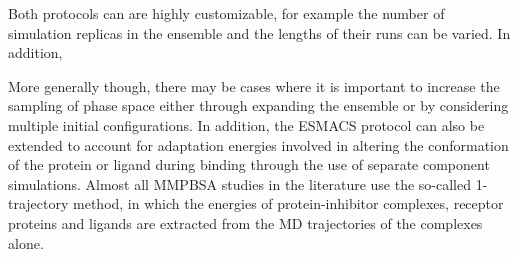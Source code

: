 Both protocols can are highly customizable, for example the number of simulation replicas in the 
ensemble and the lengths of their runs can be varied.
In addition, 

More generally though, there may be cases where it is important to increase the sampling of phase 
space either through expanding the ensemble or by considering multiple initial configurations.
In addition, the ESMACS protocol can also be extended to account for adaptation energies involved 
in altering the conformation of the protein or ligand during binding through the use of separate 
component simulations. 
Almost all MMPBSA studies in the literature use the so-called 1-trajectory method, in which the 
energies of protein-inhibitor complexes, receptor proteins and ligands are extracted from the MD 
trajectories of the complexes alone. 


